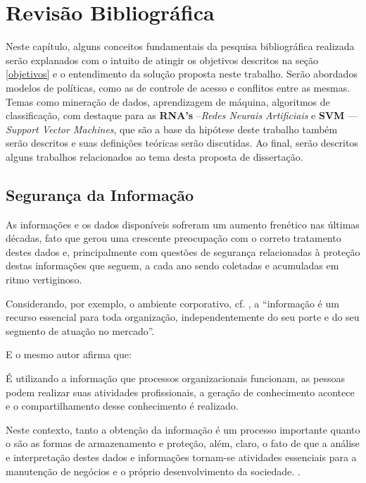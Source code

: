 \chapter{Revisão Bibliográfica}\label{referencial_teorico}
Neste capítulo, alguns conceitos fundamentais da pesquisa bibliográfica realizada serão explanados com o intuito de atingir os objetivos descritos na seção \ref{objetivos} e o entendimento da solução proposta neste trabalho. Serão abordados modelos de políticas, como as de controle de acesso e conflitos entre as mesmas. Temas como mineração de dados, aprendizagem de máquina, algoritmos de classificação, com destaque para as \textbf{RNA's} --\textit{Redes Neurais Artificiais} e \textbf{SVM} --- \textit{Support Vector Machines}, que são a base da hipótese deste trabalho também serão descritos e suas definições teóricas serão discutidas. Ao final, serão descritos alguns trabalhos relacionados ao tema desta proposta de dissertação.

\section{Segurança da Informação} \label{seguranca_informacao}
As informações e os dados disponíveis sofreram um aumento frenético nas últimas décadas, fato que gerou uma crescente preocupação com o correto tratamento destes dados e, principalmente com questões de segurança relacionadas à proteção destas informações que seguem, a cada ano sendo coletadas e acumuladas em ritmo vertiginoso. \cite{alecrim2019, machado2014, lima_fraud_2012, fayyad1996, santos_segurancnos_2007} 

Considerando, por exemplo, o ambiente corporativo, cf. , a ``informação é um recurso essencial para toda organização, independentemente do seu porte e do seu segmento de atuação no mercado''. 

E o mesmo autor afirma que: 
\begin{citacao}
	É utilizando a informação que processos organizacionais funcionam, as pessoas podem realizar suas atividades profissionais, a geração de conhecimento acontece e o compartilhamento desse conhecimento é realizado. \cite[p.1]{fontes_politicas}
\end{citacao}

Neste contexto, tanto a obtenção da informação é um processo importante quanto o são as formas de armazenamento e proteção, além, claro, o fato de que a análise e interpretação destes dados e informações tornam-se atividades essenciais para a manutenção de negócios e o próprio desenvolvimento da sociedade. \cite{Boscarioli2017} \cite{marciano_segurancda_nodate}.

